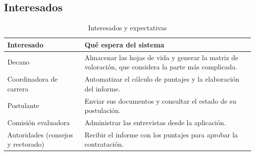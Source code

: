 \subsection{Interesados}
\begin{table}[H]
\centering
\caption{Interesados y expectativas}
\begin{tabularx}{\linewidth}{@{}p{4cm}X@{}}
\toprule
\textbf{Interesado} & \textbf{Qué espera del sistema} \\
\midrule
Decano & Almacenar las hojas de vida y generar la matriz de valoración, que considera la parte más complicada. \\
Coordinadora de carrera & Automatizar el cálculo de puntajes y la elaboración del informe. \\
Postulante & Enviar sus documentos y consultar el estado de su postulación. \\
Comisión evaluadora & Administrar las entrevistas desde la aplicación. \\
Autoridades (consejos y rectorado) & Recibir el informe con los puntajes para aprobar la contratación. \\
\bottomrule
\end{tabularx}
\end{table}